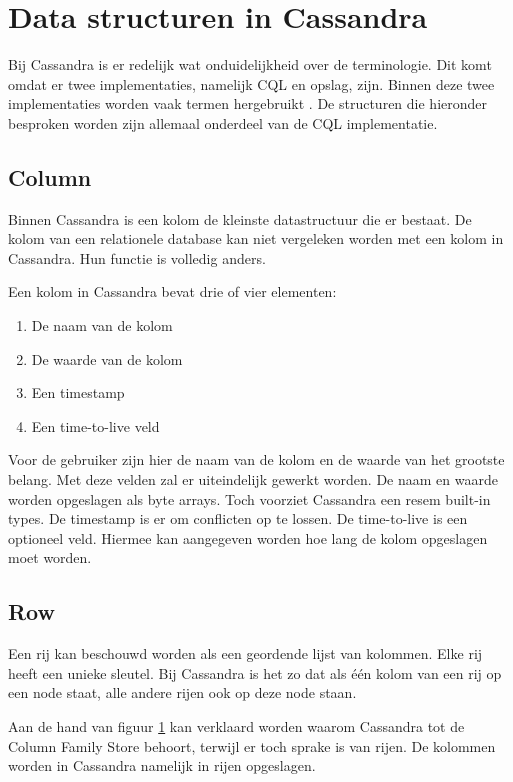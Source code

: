 \chapter{Data structuren in Cassandra}
\label{ch:cassandra_data}

Bij Cassandra is er redelijk wat onduidelijkheid over de terminologie.
Dit komt omdat er twee implementaties, namelijk CQL en opslag, zijn.
Binnen deze twee implementaties worden vaak termen hergebruikt \citep{Ahmed2015Terminology}.
De structuren die hieronder besproken worden zijn allemaal onderdeel van de CQL implementatie.

\section{Column}
Binnen Cassandra is een kolom de kleinste datastructuur die er bestaat.
De kolom van een relationele database kan niet vergeleken worden met een kolom in Cassandra.
Hun functie is volledig anders.

Een kolom in Cassandra bevat drie of vier elementen:
\begin{enumerate}
	\item De naam van de kolom
	\item De waarde van de kolom
	\item Een timestamp
	\item Een time-to-live veld
\end{enumerate}

Voor de gebruiker zijn hier de naam van de kolom en de waarde van het grootste belang.
Met deze velden zal er uiteindelijk gewerkt worden.
De naam en waarde worden opgeslagen als byte arrays.
Toch voorziet Cassandra een resem built-in types.
De timestamp is er om conflicten op te lossen.
De time-to-live is een optioneel veld.
Hiermee kan aangegeven worden hoe lang de kolom opgeslagen moet worden.

\section{Row}
Een rij kan beschouwd worden als een geordende lijst van kolommen.
Elke rij heeft een unieke sleutel.
Bij Cassandra is het zo dat als één kolom van een rij op een node staat, alle andere rijen ook op deze node staan.

Aan de hand van figuur \ref{ch:cassandra_data} kan verklaard worden waarom Cassandra tot de Column Family Store behoort, terwijl er toch sprake is van rijen.
De kolommen worden in Cassandra namelijk in rijen opgeslagen.

